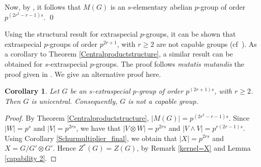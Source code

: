 \documentclass[preprint,sort&compress,12pt]{elsarticle}
\newtheorem{corollary}[theorem]{Corollary}
\numberwithin{equation}{section}
\theoremstyle{definition}
\begin{document}
    Now, by \cite[Theorem A]{HatVerYad2018}, it follows that $M(G)$ is an $s$-elementary abelian $p$-group of order $p^{(2r^2-r-1)s}$.
    \qed

Using the structural result \cite[Theorem 3.3.4]{Karp1987} for extraspecial $p$-groups, it can be shown that extraspecial $p$-groups of order $p^{2r+1}$, with ${r \geq 2}$ are not capable groups (cf~\cite[Theorem 3.3.6]{Karp1987}). As a corollary to Theorem \ref{Centralproductstructure}, a similar result can be obtained for $s$-extraspecial $p$-groups. The proof follows \textit{mutatis mutandis} the proof given in \cite{Karp1987}. We give an alternative proof here.
\begin{corollary} \label{unicentral}
    Let $G$ be an $s$-extraspecial $p$-group of order $p^{(2r+1)s}$, with ${r \geq 2}$. Then $G$ is unicentral. Consequently, $G$ is not a capable group.
\end{corollary}


\begin{proof}
By Theorem \ref{Centralproductstructure}, $|M(G)|=p^{(2r^2-r-1)s}$. Since $|W|=p^s$ and $|V|=p^{2rs}$, we have that $|V \otimes W|=p^{2rs}$ and $|V \wedge V|=p^{r(2r-1)s}$. Using Corollary \ref{Schurmultiplier_final}, we obtain that $|X|=p^{2rs}$ and $ X=G/G' \otimes G'$.  Hence $Z^*(G)=Z(G)$, by Remark \ref{kernel=X} and Lemma \ref{capability 2}.

\end{proof}
\end{document}

